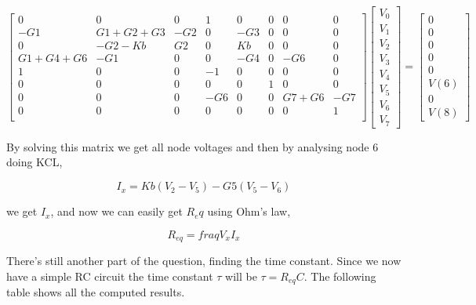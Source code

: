 $$
\begin{bmatrix}
0 & 0 & 0 & 1 & 0 & 0 & 0 & 0 \\
-G1 & G1+G2+G3 & -G2 & 0 & -G3 & 0 & 0 & 0 \\
0 & -G2-Kb & G2 & 0 & Kb & 0 & 0 & 0 \\
G1+G4+G6 & -G1 & 0 & 0 & -G4 & 0 & -G6 & 0 \\
1 & 0 & 0 & -1 & 0 & 0 & 0 & 0 \\
0 & 0 & 0 & 0 & 0 & 1 & 0 & 0 \\
0 & 0 & 0 & -G6 & 0 & 0 & G7+G6 & -G7 \\
0 & 0 & 0 & 0 & 0 & 0 & 0 & 1 \\
\end{bmatrix}
\begin{bmatrix}
V_0 \\
V_1 \\
V_2 \\
V_3 \\
V_4 \\
V_5 \\
V_6 \\
V_7  
\end{bmatrix}
=
\begin{bmatrix}
0 \\
0 \\
0 \\
0 \\
0 \\
V(6) \\
0 \\
V(8)  
\end{bmatrix}
$$

\par By solving this matrix we get all node voltages and then by analysing node 6 doing KCL,

\begin{equation}
  I_{x} = Kb(V_2-V_5) - G5(V_5-V_6)
  \label{eq:2)aux1}
\end{equation}

we get $I_x$, and now we can easily get $R_eq$ using Ohm's law,

\begin{equation}
  R_{eq} = fraq{V_x}{I_x}
  \label{eq:2)aux2}
\end{equation}

\par There's still another part of the question, finding the time constant. Since we now have a simple RC circuit the time constant $\tau$ will be $\tau = R_{eq}C$.
\the The following table shows all the computed results.



